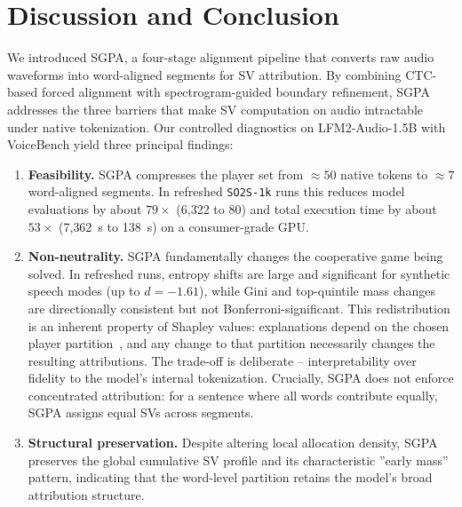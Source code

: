 \documentclass[cameraready]{Interspeech}
\begin{document}
\section{Discussion and Conclusion}
\label{sec:conclusion}

We introduced SGPA, a four-stage alignment pipeline that converts raw audio waveforms into word-aligned segments for SV attribution. By combining CTC-based forced alignment with spectrogram-guided boundary refinement, SGPA addresses the three barriers that make SV computation on audio intractable under native tokenization. Our controlled diagnostics on LFM2-Audio-1.5B with VoiceBench yield three principal findings:

\begin{enumerate}
    \item \textbf{Feasibility.} SGPA compresses the player set from ${\approx}50$ native tokens to ${\approx}7$ word-aligned segments. In refreshed \texttt{SO2S-1k} runs this reduces model evaluations by about $79\times$ (6{,}322 to 80) and total execution time by about $53\times$ (7{,}362~s to 138~s) on a consumer-grade GPU.

    \item \textbf{Non-neutrality.} SGPA fundamentally changes the cooperative game being solved. In refreshed runs, entropy shifts are large and significant for synthetic speech modes (up to $d = -1.61$), while Gini and top-quintile mass changes are directionally consistent but not Bonferroni-significant. This redistribution is an inherent property of Shapley values: explanations depend on the chosen player partition~\cite{RM-670-PR}, and any change to that partition necessarily changes the resulting attributions. The trade-off is deliberate -- interpretability over fidelity to the model's internal tokenization. Crucially, SGPA does not enforce concentrated attribution: for a sentence where all words contribute equally, SGPA assigns equal SVs across segments.

    \item \textbf{Structural preservation.} Despite altering local allocation density, SGPA preserves the global cumulative SV profile and its characteristic ''early mass'' pattern, indicating that the word-level partition retains the model's broad attribution structure.
\end{enumerate}
\end{document}

